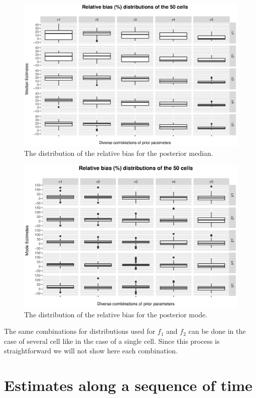 \documentclass[12pt, a4paper]{article}
\begin{document}
\begin{figure}
\centering
\includegraphics[scale=0.85]{many-cells-median.eps}
\caption{The distribution of the relative bias for the posterior median.}
\label{manycellsmedian} 	
\end{figure}

\begin{figure}
\centering
\includegraphics[scale=0.85]{many-cells-mode.eps}
\caption{The distribution of the relative bias for the posterior mode.}
\label{manycellssmode} 	
\end{figure}


The same combinations for distributions used for $f_{1}$ and $f_{2}$ can be done in the case of several cell like in the case of a single cell. Since this process is straightforward we will not show here each combination.


\section{Estimates along a sequence of time}
\end{document}
